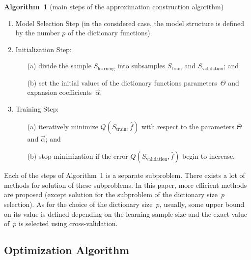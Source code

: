 \begin{multicols}{2}
\bigskip

\noindent
\textbf{Algorithm~1} (main steps of the approximation construction algorithm) %
\noindent
\begin{enumerate} 
    \item {Model Selection Step (in the considered case, the model structure 
    is defined by the number $p$ of the dictionary functions)}.\\[-9pt]
    \item Initialization Step:\\[-9pt] 
    \begin{itemize}
    \item[(a)] divide the sample $S_{\mathrm{learning}}$ 
    into subsamples $S_{\mathrm{train}}$ and $S_{\mathrm{validation}}$; and \\[-9pt]
\item[(b)] set the initial values of the dictionary functions parameters~$\Theta$ 
and expansion coefficients~$\vec \alpha$.\\[-9pt]
\end{itemize}
    \item \label{train} Training Step:\\[-9pt] 
    \begin{itemize}
\item[(a)] iteratively minimize $Q\left(S_{\mathrm{train}}, \hat f \right)$ with 
    respect to the parameters $\Theta$ and $\vec \alpha$; and\\[-9pt] 
\item[(b)] stop minimization if the error $Q\left( S_{\mathrm{validation}}, \hat f \right)$ 
    begin to increase.
    \end{itemize}
  \end{enumerate}

\medskip

Each of the steps of Algorithm~1 is a separate subproblem. 
There exists a lot of methods for solution of these subproblems. 
In this paper, more efficient methods are proposed
(except solution for the subproblem of the dictionary size~$p$ selection).
As for the choice of the dictionary size~$p$, usually, 
some upper bound on its value is defined depending on the 
learning sample size and the exact value of~$p$ is selected using cross-validation.

\subsection{Optimization Algorithm}


\end{multicols}
